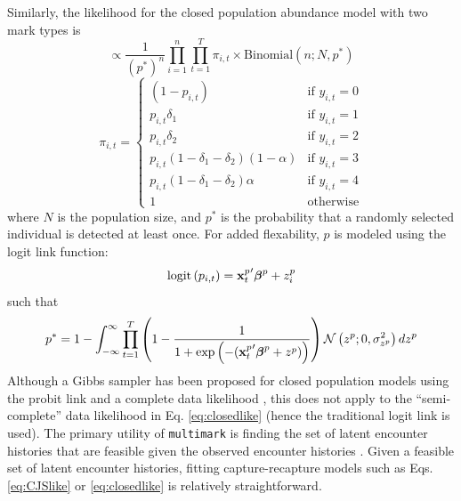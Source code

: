 \documentclass[12pt]{article}
\begin{document}
Similarly, the likelihood for the closed population abundance model with two mark types is
\begin{equation}
  [ {\bf Y} \mid {\bf p}, {\boldsymbol \delta}, \alpha, {\bf N} ] \propto \frac{1}{\left( p^* \right)^n}\prod_{i=1}^{n} \prod_{t=1}^T \pi_{i,t} \times \text{Binomial} \left(n; N, p^* \right)
  \label{eq:closedlike}
\end{equation}
\begin{equation*}
  \pi_{i,t} = \begin{cases}
                \left( 1-p_{i,t} \right) & \text{if } y_{i,t}=0\\
                p_{i,t} \delta_1  & \text{if } y_{i,t}=1\\
                p_{i,t} \delta_2  & \text{if } y_{i,t}=2\\
                p_{i,t} \left( 1 - \delta_1 - \delta_2 \right) \left( 1 - \alpha \right) & \text{if } y_{i,t}=3\\
                p_{i,t} \left( 1 - \delta_1 - \delta_2 \right) \alpha & \text{if } y_{i,t}=4\\
                1 & \text{otherwise}
              \end{cases}
\end{equation*}
where $N$ is the population size, and $p^*$ is the probability that a randomly selected individual is detected at least once. For added flexability, $p$ is modeled using the logit link function:
\begin{equation*}
  \text{logit} \left( p_{i,t} \right) = {{\bf x}^p_t}^\prime \boldsymbol{\beta}^p + z^p_i
\end{equation*}
such that
\begin{equation*}
  p^* = 1 - \int_{-\infty}^{\infty} \prod_{t=1}^T \left(1-\frac{1}{1+\exp\left(-({{\bf x}^p_t}^\prime \boldsymbol{\beta}^p + z^p)\right)} \right) {\cal N}\left(z^p;0,\sigma^2_{z^p}\right) dz^p
\end{equation*}
Although a Gibbs sampler has been proposed for closed population models using the probit link and a complete data likelihood \citep{McClintockEtAl2014}, this does not apply to the ``semi-complete'' data likelihood in Eq. \ref{eq:closedlike} (hence the traditional logit link is used). The primary utility of \verb|multimark| is finding the set of latent encounter histories that are feasible given the observed encounter histories \citep[sensu][]{LinkEtAl2010,BonnerHolmberg2013,McClintockEtAl2013a,McClintockEtAl2014}. Given a feasible set of latent encounter histories, fitting capture-recapture models such as Eqs. \ref{eq:CJSlike} or \ref{eq:closedlike} is relatively straightforward.
\end{document}
